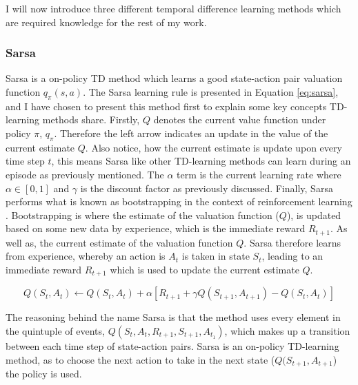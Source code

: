 \documentclass[ %
                    author={Callum Pearce},
                supervisor={Dr. Neill Campbell},
                    degree={MEng},
                     title={How effective are Temporal difference learning methods for reducing the number of zero contribution light paths, while still accurately approximating Global Illumination in Path tracing?},
                  subtitle={},
                      type={research},
                      year={2019} ]{dissertation}
\begin{document}
I will now introduce three different temporal difference learning methods which are required knowledge for the rest of my work.

\subsubsection*{Sarsa}

Sarsa is a on-policy TD method which learns a good state-action pair valuation function $q_\pi(s,a)$. The Sarsa learning rule is presented in Equation \ref{eq:sarsa}, and I have chosen to present this method first to explain some key concepts TD-learning methods share. Firstly, $Q$ denotes the current value function under policy $\pi$, $q_\pi$. Therefore the left arrow indicates an update in the value of the current estimate $Q$. Also notice, how the current estimate is update upon every time step $t$, this means Sarsa like other TD-learning methods can learn during an episode as previously mentioned. The $\alpha$ term is the current learning rate where $\alpha \in [0,1]$ and $\gamma$ is the discount factor as previously discussed. Finally, Sarsa performs what is known as bootstrapping in the context of reinforcement learning \cite{sutton2011reinforcement}. Bootstrapping is where the  estimate of the valuation function ($Q$), is updated based on some new data by experience, which is the immediate reward $R_{t+1}$. As well as, the current estimate of the valuation function $Q$. Sarsa therefore learns from experience, whereby an action is $A_t$ is taken in state $S_{t}$, leading to an immediate reward $R_{t+1}$ which is used to update the current estimate $Q$.

\begin{equation}
Q(S_t, A_t) \leftarrow Q(S_t, A_t) + \alpha[R_{t+1} + \gamma Q(S_{t+1}, A_{t+1}) - Q(S_t, A_t)]
\label{eq:sarsa}
\end{equation}

The reasoning behind the name Sarsa is that the method uses every element in the quintuple of events, $Q(S_t, A_t, R_{t+1}, S_{t+1}, A_{t_1})$, which makes up a transition between each time step of state-action pairs. Sarsa is an on-policy TD-learning method, as to choose the next action to take in the next state ($Q(S_{t+1}, A_{t+1}$) the policy is used. \\
\end{document}
